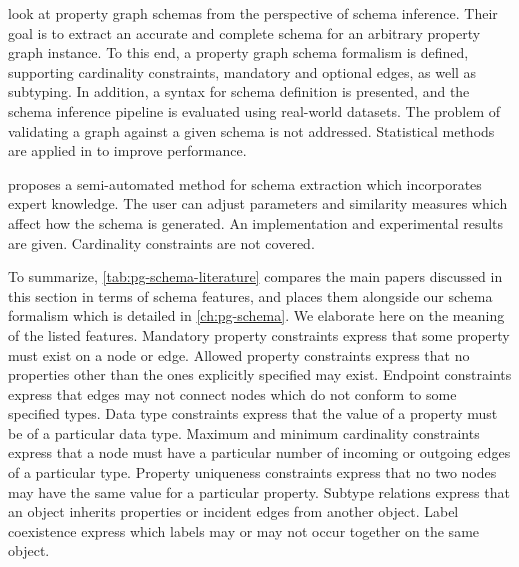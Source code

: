 \documentclass{report}
\theoremstyle{definition}
\begin{document}
\citet{lbath2021inference} look at property graph schemas from the perspective of schema inference. Their goal is to extract an accurate and complete schema for an arbitrary property graph instance. To this end, a property graph schema formalism is defined, supporting cardinality constraints, mandatory and optional edges, as well as subtyping. In addition, a syntax for schema definition is presented, and the schema inference pipeline is evaluated using real-world datasets. The problem of validating a graph against a given schema is not addressed. Statistical methods are applied in \citep{bonifati2022hierarchical} to improve performance.

\citet{lei2021thesis} proposes a semi-automated method for schema extraction which incorporates expert knowledge. The user can adjust parameters and similarity measures which affect how the schema is generated. An implementation and experimental results are given. Cardinality constraints are not covered.

To summarize, \autoref{tab:pg-schema-literature} compares the main papers discussed in this section in terms of schema features, and places them alongside our schema formalism which is detailed in \autoref{ch:pg-schema}. We elaborate here on the meaning of the listed features. Mandatory property constraints express that some property must exist on a node or edge. Allowed property constraints express that no properties other than the ones explicitly specified may exist. Endpoint constraints express that edges may not connect nodes which do not conform to some specified types. Data type constraints express that the value of a property must be of a particular data type. Maximum and minimum cardinality constraints express that a node must have a particular number of incoming or outgoing edges of a particular type. Property uniqueness constraints express that no two nodes may have the same value for a particular property. Subtype relations express that an object inherits properties or incident edges from another object. Label coexistence express which labels may or may not occur together on the same object.
\end{document}
